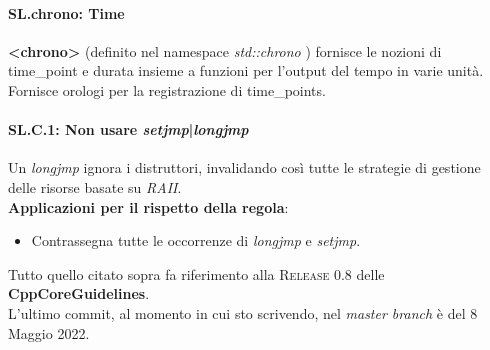 
\paragraph{SL.chrono: Time}

\textsf{\small \textbf{<chrono>} (definito nel namespace \emph{std::chrono} ) fornisce le nozioni di time\_point e durata insieme a funzioni per l'output del tempo in varie unità. Fornisce orologi per la registrazione di time\_points.} \\


\paragraph{SL.C.1: Non usare \emph{setjmp}|\emph{longjmp}}

\textsf{\small Un \emph{longjmp} ignora i distruttori, invalidando così tutte le strategie di gestione delle risorse basate su \emph{RAII}.} \\

\textsf{\small \textbf{Applicazioni per il rispetto della regola}: }

\begin{itemize}
	\item \textsf{\small Contrassegna tutte le occorrenze di \emph{longjmp} e \emph{setjmp}.}
\end{itemize}

\fleuron

\textsf{\small Tutto quello citato sopra fa riferimento alla \textsc{Release 0.8} delle \textbf{CppCoreGuidelines}.} \\
\textsf{\small L'ultimo commit, al momento in cui sto scrivendo, nel \emph{master branch} è del 8 Maggio 2022.} \\ %